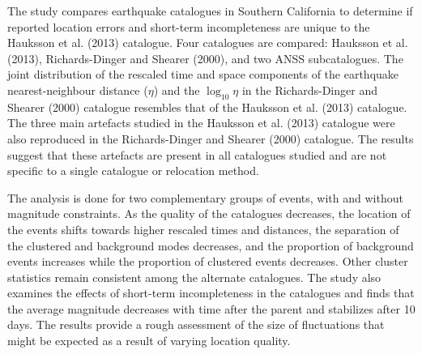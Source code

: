 \documentclass[12pt]{article} %
\theoremstyle{plain}
\begin{document}
	
	
	The study compares earthquake catalogues in Southern California to determine if reported location errors and short-term incompleteness are unique to the Hauksson et al. (2013) catalogue. Four catalogues are compared: Hauksson et al. (2013), Richards-Dinger and Shearer (2000), and two ANSS subcatalogues. The joint distribution of the rescaled time and space components of the earthquake nearest-neighbour distance ($\eta$) and the $\log_{10}\eta$ in the Richards-Dinger and Shearer (2000) catalogue resembles that of the Hauksson et al. (2013) catalogue. The three main artefacts studied in the Hauksson et al. (2013) catalogue were also reproduced in the Richards-Dinger and Shearer (2000) catalogue. The results suggest that these artefacts are present in all catalogues studied and are not specific to a single catalogue or relocation method.
	
	The analysis is done for two complementary groups of events, with and without magnitude constraints. As the quality of the catalogues decreases, the location of the events shifts towards higher rescaled times and distances, the separation of the clustered and background modes decreases, and the proportion of background events increases while the proportion of clustered events decreases. Other cluster statistics remain consistent among the alternate catalogues. The study also examines the effects of short-term incompleteness in the catalogues and finds that the average magnitude decreases with time after the parent and stabilizes after 10 days. The results provide a rough assessment of the size of fluctuations that might be expected as a result of varying location quality.
	
\end{document}
